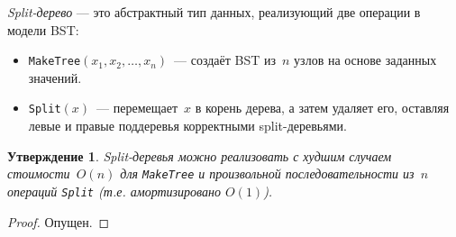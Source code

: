 \documentclass[a4paper,11pt]{article}
\newtheorem{statement}{Утверждение}
\begin{document}
\begin{definition}
	\emph{Split-дерево} — это абстрактный тип данных, реализующий две операции в модели BST:
\begin{itemize}
    \item \texttt{MakeTree}$(x_1, x_2, \dots, x_n)$~--- создаёт BST из~$n$ узлов на основе заданных значений.
    \item \texttt{Split}$(x)$~--- перемещает~$x$ в корень дерева, а затем удаляет его, оставляя левые и правые поддеревья корректными split-деревьями.
\end{itemize}
\end{definition}

\begin{statement}
	Split-деревья можно реализовать с худшим случаем стоимости~$O(n)$ для \texttt{MakeTree} и произвольной последовательности из~$n$ операций \texttt{Split} (т.е. амортизировано $O(1)$).
\end{statement}
\begin{proof}
	Опущен.
\end{proof}
\end{document}
